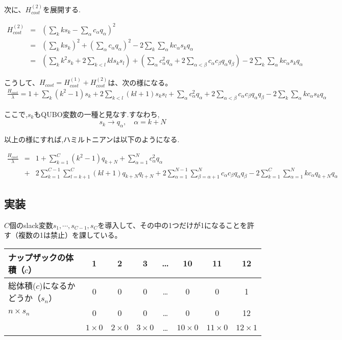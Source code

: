 \documentclass[uplatex,dvipdfmx,a4paper,11pt,oneside,openany]{jsbook}
\begin{document}
次に、$H_{cost}^{(2)}$を展開する.

\begin{eqnarray*}
  H_{cost} ^{(2)} &=& \left( \sum _{k} k s_{k} - \sum _{\alpha} c_{\alpha} q_{\alpha} \right) ^{2} \\
  &=& \left( \sum _{k} k s_{k} \right) ^{2} + \left( \sum _{\alpha} c_{\alpha} q_{\alpha} \right) ^{2} - 2 \sum _{k} \sum _{\alpha} kc_{\alpha} s_{k} q_{\alpha} \\
  &=& \left(\sum _{k} k^{2} s_{k} + 2\sum _{k < l} kls_{k}s_{l}\right) + \left(\sum _{\alpha} c_{\alpha} ^{2} q_{\alpha} + 2\sum _{\alpha < \beta} c_{\alpha} c_{\beta} q_{\alpha} q_{\beta}\right) - 2 \sum_{k} \sum _{\alpha} kc_{\alpha} s_{k} q_{\alpha}
\end{eqnarray*}

こうして、$H_{cost}=H_{cost}^{(1)}+H_{cost}^{(2)}$は、次の様になる。
\begin{eqnarray*}
  \frac{H_{cost}}{\lambda } = 1 + \sum _{k} (k^{2} - 1) s_{k} + 2\sum _{k < l} (kl + 1) s_{k}s_{l} + \sum _{\alpha} c_{\alpha} ^{2} q_{\alpha} + 2\sum _{\alpha < \beta} c_{\alpha} c_{\beta} q_{\alpha} q_{\beta} - 2 \sum_{k} \sum _{\alpha} kc_{\alpha} s_{k} q_{\alpha}
\end{eqnarray*}


ここで,$s_k$もQUBO変数の一種と見なす.すなわち,
\[
s_{k} \longrightarrow q_{\alpha}, \quad \alpha = k + N
\]

以上の様にすれば,ハミルトニアンは以下のようになる.

\begin{eqnarray*}
    \frac{H_{cost}}{\lambda} &=& 1 + \sum _{k=1} ^{C} (k^{2} - 1) q_{k + N} + \sum _{\alpha=1} ^{N} c_{\alpha} ^{2} q_{\alpha}\\
    & +& 2\sum _{k=1} ^{C-1} \sum _{l=k+1}^{C} (kl + 1) q_{k+N}q_{l+N} + 2\sum _{\alpha = 1} ^{N-1} \sum _{\beta = \alpha + 1} ^{N} c_{\alpha} c_{\beta} q_{\alpha} q_{\beta} - 2 \sum_{k=1} ^{C} \sum _{\alpha=1} ^{N} kc_{\alpha} q_{k+N} q_{\alpha}
\end{eqnarray*}

\subsection{実装}

$C$個のslack変数$s_1, \cdots, s_{C-1}, s_C$を導入して、その中の1つだけが1になることを許す（複数の1は禁止）を課している。\\

\begin{tabular}{|l|c|c|c|c|c|c|c|}\hline
  ナップザックの体積（$c$） & 1 & 2 & 3 & \dots & 10 & 11 & 12 \\\hline
  総体積($c$)になるかどうか（$s_n$） & 0 & 0 & 0 & \dots & 0 & 0 & 1 \\\hline
  $n\times s_n$ & 0 & 0 & 0 & \dots & 0 & 0 & 12 \\
  & $1\times 0$ & $2\times 0$ & $3\times 0$ & \dots & $10\times 0$ & $11\times 0$ & $12\times 1$ \\\hline
 \end{tabular}\\
\end{document}
